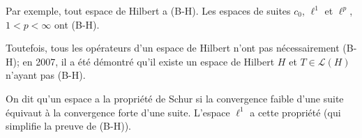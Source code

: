 \begin{ex}
  Par exemple, tout espace de Hilbert a (B-H). Les espaces
  de suites $c_0$, $\ell^1$ et $\ell^p$, $1 < p < \infty$ ont (B-H).

  Toutefois, tous les opérateurs d'un espace de Hilbert n'ont pas nécessairement
  (B-H); en 2007, il a été démontré qu'il existe un espace de Hilbert $H$ et
  $T\in \mathcal L(H)$ n'ayant pas (B-H).
\end{ex}

\begin{rem}
  On dit qu'un espace a la propriété de Schur si la convergence faible d'une
  suite équivaut à la convergence forte d'une suite. L'espace
  $\ell^1$ a cette propriété (qui simplifie la preuve de (B-H)).
\end{rem}

